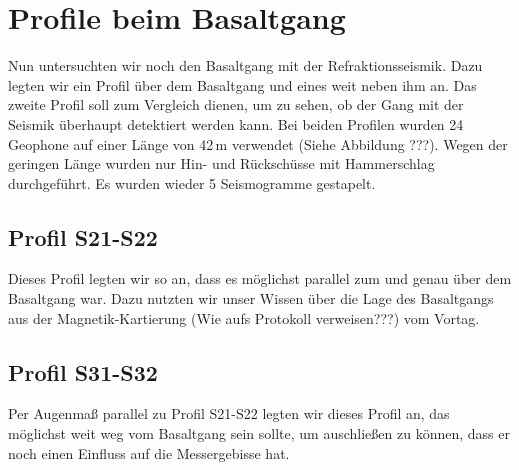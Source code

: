 \section{Profile beim Basaltgang}

Nun untersuchten wir noch den Basaltgang mit der Refraktionsseismik. Dazu legten wir ein Profil über dem Basaltgang und eines weit neben ihm an. Das zweite Profil soll zum Vergleich dienen, um zu sehen, ob der Gang mit der Seismik überhaupt detektiert werden kann. Bei beiden Profilen wurden 24 Geophone auf einer Länge von 42\,m verwendet (Siehe Abbildung ???). Wegen der geringen Länge wurden nur Hin- und Rückschüsse mit Hammerschlag durchgeführt. Es wurden wieder 5 Seismogramme gestapelt.

\subsection{Profil S21-S22}

Dieses Profil legten wir so an, dass es möglichst parallel zum und genau über dem Basaltgang war. Dazu nutzten wir unser Wissen über die Lage des Basaltgangs aus der Magnetik-Kartierung (Wie aufs Protokoll verweisen???) vom Vortag.

\subsection{Profil S31-S32}

Per Augenmaß parallel zu Profil S21-S22 legten wir dieses Profil an, das möglichst weit weg vom Basaltgang sein sollte, um auschließen zu können, dass er noch einen Einfluss auf die Messergebisse hat. 